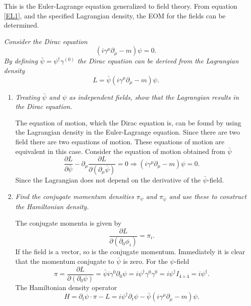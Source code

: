 This is the Euler-Lagrange equation generalized to field theory. From equation \eqref{EL1}, and the specified Lagrangian density, the EOM for the fields can be determined. 
\begin{example}
	\emph{Consider the Dirac equation}
	\begin{equation}
		(i\gamma^{\mu}\partial_\mu-m)\psi=0.
	\end{equation} 
	\emph{By defining $\bar{\psi}=\psi^\dagger\gamma^{(0)}$ the Dirac equation can be derived from the Lagrangian density}
	\begin{equation}
		L=\bar{\psi}(i\gamma^{\mu}\partial_\mu-m)\psi.
	\end{equation} 
	
	\begin{enumerate}
		\item \emph{Treating $\bar{\psi}$ and $\psi$ as independent fields, show that the Lagrangian results in the Dirac equation.}\newline
		
		The equation of motion, which the Dirac equation is, can be found by using the Lagrangian density in the Euler-Lagrange equation. Since there are two field there are two equations of motion. These equations of motion are equivalent in this case. Consider the equation of motion obtained from $\bar{\psi}$
		\begin{equation}
			\frac{\partial L}{\partial \bar{\psi}}-\partial_\mu\frac{\partial L }{\partial (\partial_\mu\bar{\psi})}=0\Rightarrow (i\gamma^{\mu}\partial_\mu-m)\psi=0.
		\end{equation} 
		Since the Lagrangian does not depend on the derivative of the $\bar{\psi}$-field. 
		
		\item \emph{Find the conjugate momentum densities $\pi_{\psi}$ and $\pi_{\bar{\psi}}$ and use these to construct the Hamiltonian density.}\newline
		
		The conjugate momenta is given by
		\begin{equation}
			\frac{\partial L }{\partial (\partial_0\phi_i)}=\pi_{i}.
		\end{equation} 
		If the field is a vector, so is the conjugate momentum. Immediately it is clear that the momentum conjugate to $\bar{\psi}$ is zero. For the $\psi$-field
		\begin{equation}
			\pi=\frac{\partial L }{\partial (\partial_0\psi)}=\bar{\psi}i\gamma^{0}\partial_0\psi=i\psi^\dagger \gamma^{0}\gamma^{0}=i\psi^\dagger I_{4\times 4}=i\psi^\dagger.
		\end{equation} 
		The Hamiltonian density operator
		\begin{equation}
			H=\partial_t\psi\cdot\pi-L=i\psi^\dagger\partial_t\psi -\bar{\psi}(i\gamma^{\mu}\partial_\mu-m)\psi.
		\end{equation} 
	\end{enumerate}
\end{example}
